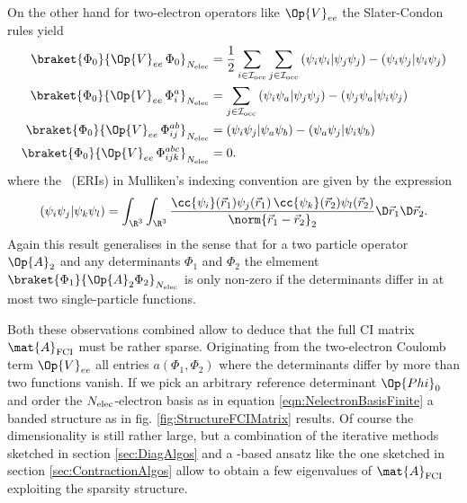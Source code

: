 \begin{rem}
	On the other hand for
	two-electron operators like $\Op{V}_{ee}$
	the Slater-Condon rules yield
	\begin{equation}
	\begin{aligned}
		\braket{\Phi_0}{\Op{V}_{ee}\, \Phi_0}_{\Nelec}
		&= \frac12 \sum_{i\in\Iocc} \sum_{j\in\Iocc}
			  \eriMu{\psi_i\psi_i}{\psi_j\psi_j}
			- \eriMu{\psi_i\psi_j}{\psi_i\psi_j} \\
		\braket{\Phi_0}{\Op{V}_{ee}\, \Phi_i^a}_{\Nelec}
		&= \sum_{j\in\Iocc}
			  \eriMu{\psi_i\psi_a}{\psi_j\psi_j}
			- \eriMu{\psi_j\psi_a}{\psi_i\psi_j} \\
		\braket{\Phi_0}{\Op{V}_{ee}\, \Phi_{ij}^{ab}}_{\Nelec}
		&= \eriMu{\psi_i\psi_j}{\psi_a\psi_b}
		 - \eriMu{\psi_a\psi_j}{\psi_i\psi_b} \\
		\braket{\Phi_0}{\Op{V}_{ee}\, \Phi_{ijk}^{abc}}_{\Nelec} &= 0.
	\end{aligned}
		\label{eqn:SlaterCondonCoulomb}
	\end{equation}
	where the ~(ERIs)
	in Mulliken's indexing convention are given by the expression
	\begin{equation}
		\eriMu{\psi_i \psi_j}{\psi_k \psi_l}
			= \int_{\R^3} \int_{\R^3}
				\frac{\cc{\psi_i}(\vec{r}_1) \psi_j(\vec{r}_1)
					\,\cc{\psi_k}(\vec{r}_2) \psi_l(\vec{r}_2)}
				{\norm{\vec{r}_1 - \vec{r}_2}_2}
				\D \vec{r}_1 \D \vec{r}_2.
		\label{eqn:ERI}
	\end{equation}
	Again this result generalises in the sense
	that for a two particle operator $\Op{A}_2$
	and any determinants $\Phi_1$ and $\Phi_2$
	the elmement $\braket{\Phi_1}{\Op{A}_2 \Phi_2}_{\Nelec}$
	is only non-zero if the determinants
	differ in at most two single-particle functions.

	Both these observations combined allow to deduce
	that the full CI matrix $\mat{A}_\text{FCI}$ must be rather sparse.
	Originating from the two-electron Coulomb term $\Op{V}_{ee}$
	all entries $a(\Phi_1, \Phi_2)$ where the determinants
	differ by more than two functions vanish.
	If we pick an arbitrary reference determinant $\Op{Phi}_0$
	and order the $N_\text{elec}$-electron basis as in equation \eqref{eqn:NelectronBasisFinite}
	a banded structure as in fig. \vref{fig:StructureFCIMatrix} results.
	Of course the dimensionality is still rather large,
	but a combination of the iterative methods sketched
	in section \vref{sec:DiagAlgos}
	and a \contraction-based ansatz like the one sketched in section \vref{sec:ContractionAlgos}
	allow to obtain a few eigenvalues of $\mat{A}_\text{FCI}$
	exploiting the sparsity structure.
\end{rem}
